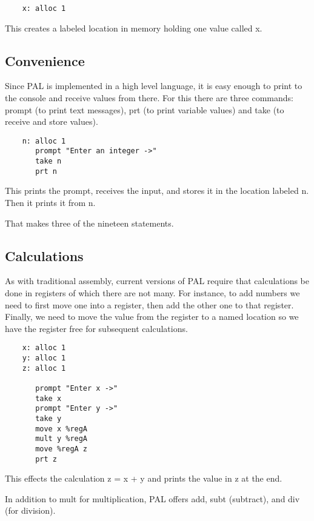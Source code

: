 {\footnotesize
\begin{verbatim}
    x: alloc 1
\end{verbatim}
}

This creates a labeled location in memory holding one value called x.

\subsection{Convenience}

Since PAL is implemented in a high level language, it is easy enough
to print to the console and receive values from there.
For this there are three commands: prompt (to print text messages),
prt (to print variable values) and take (to receive and store values).

{\footnotesize
\begin{verbatim}
    n: alloc 1
       prompt "Enter an integer ->"
       take n
       prt n
\end{verbatim}
}

This prints the prompt, receives the input, and stores it in the location
labeled n. Then it prints it from n.

That makes three of the nineteen statements.

\subsection{Calculations}

As with traditional assembly, current versions of PAL require that
calculations be done in registers of which there are not many.
For instance, to add numbers we need to first move one into a
register, then add the other one to that register. Finally, we
need to move the value from the register to a named location so
we have the register free for subsequent calculations.

{\footnotesize
\begin{verbatim}
    x: alloc 1
    y: alloc 1
    z: alloc 1

       prompt "Enter x ->"
       take x
       prompt "Enter y ->"
       take y
       move x %regA
       mult y %regA
       move %regA z
       prt z
\end{verbatim}
}

This effects the calculation z = x + y and prints the value in z at the end.

In addition to mult for multiplication, PAL offers add, subt (subtract),
and div (for division).

